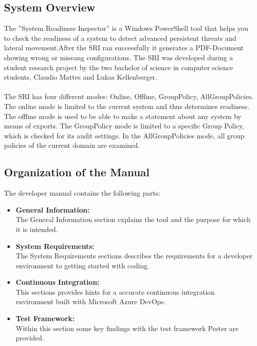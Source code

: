 
 \label{GeneralInfo}
\thispagestyle{plain}
\renewcommand\section{\stdsection}
\setcounter{section}{1}
\subsection{System Overview}
The ''System Readiness Inspector'' is a Windows PowerShell tool that helps you to check the readiness of a system to detect advanced persistent threats and lateral movement.After the SRI ran successfully it generates a PDF-Document showing wrong or missung configurations. The SRI was developed during a student research project by the two bachelor of science in computer science students, Claudio Mattes and Lukas Kellenberger.
\\\\
The SRI has four different modes: Online, Offline, GroupPolicy, AllGroupPolicies. The online mode is limited to the current system and thus determines readiness. The offline mode is used to be able to make a statement about any system by means of exports. The GroupPolicy mode is limited to a specific Group Policy, which is checked for its audit settings. In the AllGroupPolicies mode, all group policies of the current domain are examined.

\subsection{Organization of the Manual}
The developer manual contains the following parts: 
\begin{itemize}
    \item \textbf{General Information:} \ \\
    The General Information section explains the tool and the purpose for which it is intended.
    \item \textbf{System Requirements:} \ \\
    The System Requirements sections describes the requirements for a developer environment to getting started with coding. 
    \item \textbf{Continuous Integration:} \ \\
    This sections provides hints for a accurate continuous integration environment built with Microsoft Azure DevOps.
    \item \textbf{Test Framework:} \ \\
    Within this section some key findings with the test framework Pester are provided.
\end{itemize}


